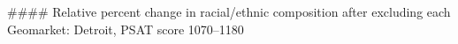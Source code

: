 #### Relative percent change in racial/ethnic composition after excluding each Geomarket: Detroit, PSAT score 1070–1180
